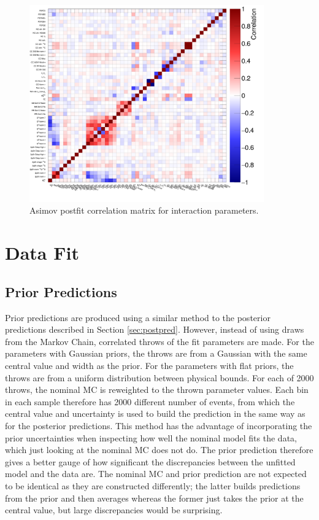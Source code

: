 \begin{figure}[!htbp]
\centering
\includegraphics*[width=0.9\textwidth,clip]{figs/Mach3AsmvCorrXsec}
\caption{Asimov postfit correlation matrix for interaction parameters.}\label{fig:asmvpostfitcovXsec}
\end{figure}

\section{Data Fit}\label{sec:datafit}

\subsection{Prior Predictions}

Prior predictions are produced using a similar method to the posterior predictions described in Section \ref{sec:postpred}. However, instead of using draws from the Markov Chain, correlated throws of the fit parameters are made. For the parameters with Gaussian priors, the throws are from a Gaussian with the same central value and width as the prior. For the parameters with flat priors, the throws are from a uniform distribution between physical bounds. For each of 2000 throws, the nominal MC is reweighted to the thrown parameter values. Each bin in each sample therefore has 2000 different number of events, from which the central value and uncertainty is used to build the prediction in the same way as for the posterior predictions. This method has the advantage of incorporating the prior uncertainties when inspecting how well the nominal model fits the data, which just looking at the nominal MC does not do. The prior prediction therefore gives a better gauge of how significant the discrepancies between the unfitted model and the data are. The nominal MC and prior prediction are not expected to be identical as they are constructed differently; the latter builds predictions from the prior and then averages whereas the former just takes the prior at the central value, but large discrepancies would be surprising.


